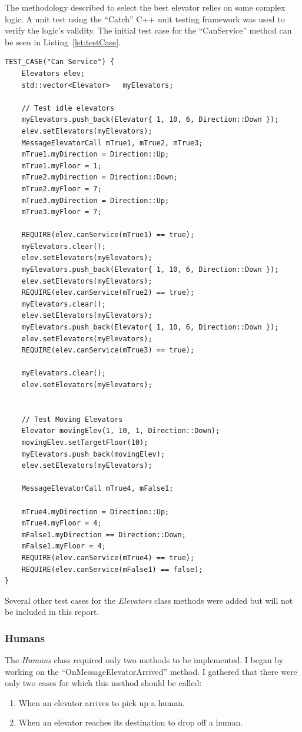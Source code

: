 \documentclass{article}
\begin{document}
The methodology described to select the best elevator relies on some complex logic. 
A unit test using the ``Catch'' C++ unit testing framework was used to verify the logic's validity.
The initial test case for the ``CanService'' method can be seen in Listing~\ref{lst:testCase}.
\begin{lstlisting}[float,caption={Can Service Test Case},xleftmargin=.15\textwidth,label={lst:testCase}]
TEST_CASE("Can Service") {
	Elevators elev;
	std::vector<Elevator>	myElevators;
	
	// Test idle elevators
	myElevators.push_back(Elevator{ 1, 10, 6, Direction::Down });
	elev.setElevators(myElevators);
	MessageElevatorCall mTrue1, mTrue2, mTrue3;
	mTrue1.myDirection = Direction::Up;
	mTrue1.myFloor = 1;
	mTrue2.myDirection = Direction::Down;
	mTrue2.myFloor = 7;
	mTrue3.myDirection = Direction::Up;
	mTrue3.myFloor = 7;
	
	REQUIRE(elev.canService(mTrue1) == true);
	myElevators.clear();
	elev.setElevators(myElevators);
	myElevators.push_back(Elevator{ 1, 10, 6, Direction::Down });
	elev.setElevators(myElevators);
	REQUIRE(elev.canService(mTrue2) == true);
	myElevators.clear();
	elev.setElevators(myElevators);
	myElevators.push_back(Elevator{ 1, 10, 6, Direction::Down });
	elev.setElevators(myElevators);
	REQUIRE(elev.canService(mTrue3) == true);
	
	myElevators.clear();
	elev.setElevators(myElevators);
	
	
	// Test Moving Elevators
	Elevator movingElev(1, 10, 1, Direction::Down);
	movingElev.setTargetFloor(10);
	myElevators.push_back(movingElev);
	elev.setElevators(myElevators);
	
	MessageElevatorCall mTrue4, mFalse1;
	
	mTrue4.myDirection = Direction::Up;
	mTrue4.myFloor = 4;
	mFalse1.myDirection == Direction::Down;
	mFalse1.myFloor = 4;
	REQUIRE(elev.canService(mTrue4) == true);
	REQUIRE(elev.canService(mFalse1) == false);
}
\end{lstlisting}
Several other test cases for the \textit{Elevators} class methods were added but will not be included in this report.

\subsubsection{Humans}
The \textit{Humans} class required only two methods to be implemented.
I began by working on the ``OnMessageElevatorArrived'' method.
I gathered that there were only two cases for which this method should be called:
\begin{enumerate}
	\item When an elevator arrives to pick up a human.
	\item When an elevator reaches its destination to drop off a human.
\end{enumerate}
\end{document}
